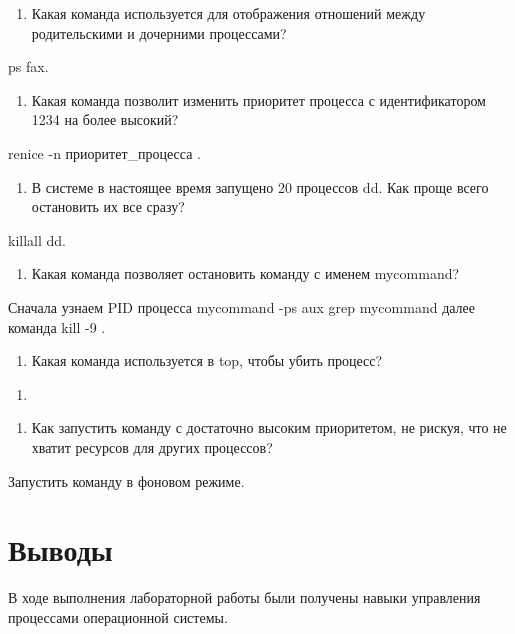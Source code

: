 \documentclass[
  english,
  russian,
  12pt,
  a4paper,
  DIV=11,
  numbers=noendperiod]{scrreprt}
\providecommand{\tightlist}{%
  \setlength{\itemsep}{0pt}\setlength{\parskip}{0pt}}
\begin{document}
\begin{enumerate}
\def\labelenumi{\arabic{enumi}.}
\setcounter{enumi}{4}
\tightlist
\item
  Какая команда используется для отображения отношений между
  родительскими и дочерними процессами?
\end{enumerate}

ps fax.

\begin{enumerate}
\def\labelenumi{\arabic{enumi}.}
\setcounter{enumi}{5}
\tightlist
\item
  Какая команда позволит изменить приоритет процесса с идентификатором
  1234 на более высокий?
\end{enumerate}

renice -n приоритет\_процесса .

\begin{enumerate}
\def\labelenumi{\arabic{enumi}.}
\setcounter{enumi}{6}
\tightlist
\item
  В системе в настоящее время запущено 20 процессов dd. Как проще всего
  остановить их все сразу?
\end{enumerate}

killall dd.

\begin{enumerate}
\def\labelenumi{\arabic{enumi}.}
\setcounter{enumi}{7}
\tightlist
\item
  Какая команда позволяет остановить команду с именем mycommand?
\end{enumerate}

Сначала узнаем PID процесса mycommand -ps aux \textbar{} grep mycommand
далее команда kill -9 .

\begin{enumerate}
\def\labelenumi{\arabic{enumi}.}
\setcounter{enumi}{8}
\tightlist
\item
  Какая команда используется в top, чтобы убить процесс?
\end{enumerate}

\begin{enumerate}
\def\labelenumi{\alph{enumi}.}
\setcounter{enumi}{10}
\tightlist
\item
\end{enumerate}

\begin{enumerate}
\def\labelenumi{\arabic{enumi}.}
\setcounter{enumi}{9}
\tightlist
\item
  Как запустить команду с достаточно высоким приоритетом, не рискуя, что
  не хватит ресурсов для других процессов?
\end{enumerate}

Запустить команду в фоновом режиме.

\chapter{Выводы}\label{ux432ux44bux432ux43eux434ux44b}

В ходе выполнения лабораторной работы были получены навыки управления
процессами операционной системы.


\printbibliography
\end{document}
